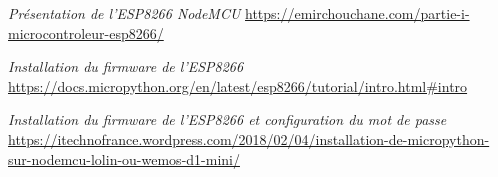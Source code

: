 \begin{thebibliography}{}


	  \bibitem{}
	  \emph{Présentation de l'ESP8266 NodeMCU} \newline 
	  \url{https://emirchouchane.com/partie-i-microcontroleur-esp8266/}

      \bibitem{}
	  \emph{Installation du firmware de l'ESP8266} \newline 
	  \url{https://docs.micropython.org/en/latest/esp8266/tutorial/intro.html#intro}

    \bibitem{}
      \emph{Installation du firmware de l'ESP8266 et configuration du mot de passe} \newline 
	  \url{https://itechnofrance.wordpress.com/2018/02/04/installation-de-micropython-sur-nodemcu-lolin-ou-wemos-d1-mini/} 


\end{thebibliography}

	  